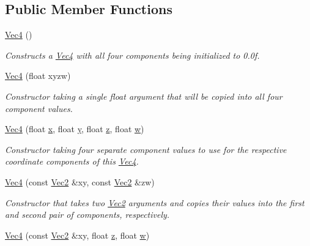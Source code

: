 \subsection*{Public Member Functions}
\begin{DoxyCompactItemize}
\item 
\hyperlink{classgofxmath_1_1_vec4_a7a727dfa08432cb340cf3a1410207146}{Vec4} ()
\begin{DoxyCompactList}\small\item\em Constructs a \hyperlink{classgofxmath_1_1_vec4}{Vec4} with all four components being initialized to 0.\+0f. \end{DoxyCompactList}\item 
\hyperlink{classgofxmath_1_1_vec4_aa0a1e6f13fc7070685e855af55fd99be}{Vec4} (float xyzw)
\begin{DoxyCompactList}\small\item\em Constructor taking a single float argument that will be copied into all four component values. \end{DoxyCompactList}\item 
\hyperlink{classgofxmath_1_1_vec4_a8f87f642984868d51e2aa88b34b40031}{Vec4} (float \hyperlink{classgofxmath_1_1_vec4_a5de27b4df2e699a1b30ec3a51258f208}{x}, float \hyperlink{classgofxmath_1_1_vec4_a22b749162a1507a1a5d3968b70c6ee4d}{y}, float \hyperlink{classgofxmath_1_1_vec4_a36bc9ebeb3901746c975252b329c1d8c}{z}, float \hyperlink{classgofxmath_1_1_vec4_aeda815ed6e7a8febdffcdfa6cc8a2d04}{w})
\begin{DoxyCompactList}\small\item\em Constructor taking four separate component values to use for the respective coordinate components of this \hyperlink{classgofxmath_1_1_vec4}{Vec4}. \end{DoxyCompactList}\item 
\hyperlink{classgofxmath_1_1_vec4_aa913db154516ac95e76df5d08305e68c}{Vec4} (const \hyperlink{classgofxmath_1_1_vec2}{Vec2} \&xy, const \hyperlink{classgofxmath_1_1_vec2}{Vec2} \&zw)
\begin{DoxyCompactList}\small\item\em Constructor that takes two \hyperlink{classgofxmath_1_1_vec2}{Vec2} arguments and copies their values into the first and second pair of components, respectively. \end{DoxyCompactList}\item 
\hyperlink{classgofxmath_1_1_vec4_a30cd9c8e9a00b514363d27e4525bdc98}{Vec4} (const \hyperlink{classgofxmath_1_1_vec2}{Vec2} \&xy, float \hyperlink{classgofxmath_1_1_vec4_a36bc9ebeb3901746c975252b329c1d8c}{z}, float \hyperlink{classgofxmath_1_1_vec4_aeda815ed6e7a8febdffcdfa6cc8a2d04}{w})

\end{DoxyCompactItemize}
